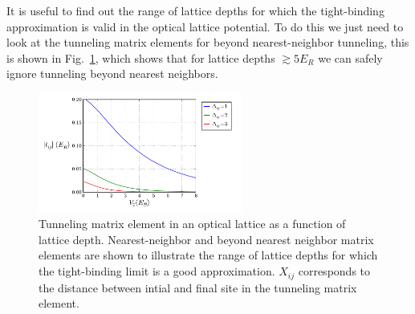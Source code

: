 \documentclass[oneside,11pt]{memoir}
\begin{document}
It is useful to find out the range of lattice depths for which the
tight-binding approximation is valid in the optical lattice potential.  To do
this we just need to look at the tunneling matrix elements for beyond
nearest-neighbor tunneling,  this is shown in Fig.~\ref{fig:tightbinding},
which shows that for lattice depths $\gtrsim 5 E_{R}$  we can safely ignore
tunneling beyond nearest neighbors.  
\begin{figure}
\centering \includegraphics[width=0.6\textwidth]{../figures/BandStructure_figures/tightbinding_V0_interp.pdf}
\caption[Tunneling matrix elements in a 3D lattice.]{\small Tunneling matrix
element in an optical lattice as a function of lattice depth.  Nearest-neighbor
and beyond nearest neighbor matrix elements are shown to illustrate the range
of lattice depths for which the tight-binding limit is a good approximation.
$X_{ij}$ corresponds to the distance between intial and final site in the
tunneling matrix element. 
 } \label{fig:tightbinding}
\end{figure}
\end{document}
